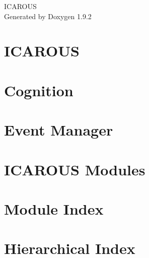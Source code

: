 \documentclass[twoside]{book}
\newcommand{\+}{\discretionary{\mbox{\scriptsize$\hookleftarrow$}}{}{}}
\newcommand{\clearemptydoublepage}{%
    \newpage{\pagestyle{empty}\cleardoublepage}%
  }
\begin{document}
  \raggedbottom
    \hypersetup{pageanchor=false,
                bookmarksnumbered=true,
                pdfencoding=unicode
               }
  \begin{titlepage}
  \vspace*{7cm}
  \begin{center}%
  {\Large ICAROUS}\\
  \vspace*{1cm}
  {\large Generated by Doxygen 1.9.2}\\
  \end{center}
  \end{titlepage}
  \clearemptydoublepage
  \tableofcontents
  \clearemptydoublepage
  \hypersetup{pageanchor=true}
\chapter{ICAROUS}
\label{index}\hypertarget{index}{}
\chapter{Cognition}
\label{md__modules__core__cognition__requirements_design}

\chapter{Event Manager}
\label{md__modules__core__event_manager__requirements_design}

\chapter{ICAROUS Modules}
\label{md__modules__r_e_a_d_m_e}

\chapter{Module Index}

\chapter{Hierarchical Index}

\end{document}
